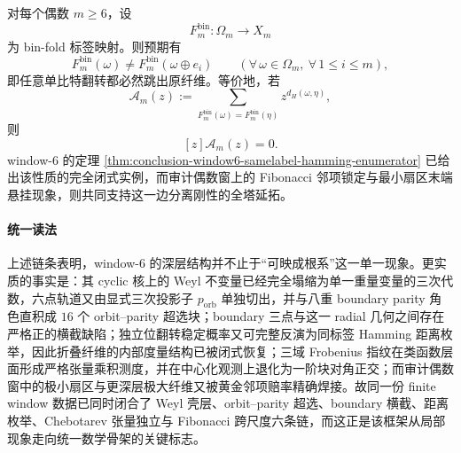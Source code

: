 

\begin{conjecture}[偶数窗的全塔边分离刚性]\label{conj:conclusion-even-window-global-edge-separation}
对每个偶数 \(m\ge 6\)，设
\[
F_m^{\mathrm{bin}}:\Omega_m\to X_m
\]
为 bin-fold 标签映射。则预期有
\[
F_m^{\mathrm{bin}}(\omega)\neq F_m^{\mathrm{bin}}(\omega\oplus e_i)
\qquad
(\forall\,\omega\in \Omega_m,\ \forall\,1\le i\le m),
\]
即任意单比特翻转都必然跳出原纤维。等价地，若
\[
\mathcal A_m(z):=
\sum_{F_m^{\mathrm{bin}}(\omega)=F_m^{\mathrm{bin}}(\eta)}z^{d_H(\omega,\eta)},
\]
则
\[
[z]\mathcal A_m(z)=0.
\]
window-\(6\) 的定理 \ref{thm:conclusion-window6-samelabel-hamming-enumerator} 已给出该性质的完全闭式实例，而审计偶数窗上的 Fibonacci 邻项锁定与最小扇区末端悬挂现象，则共同支持这一边分离刚性的全塔延拓。
\end{conjecture}

\paragraph{统一读法}
上述链条表明，window-\(6\) 的深层结构并不止于“可映成根系”这一单一现象。更实质的事实是：其 cyclic 核上的 Weyl 不变量已经完全塌缩为单一重量变量的三次代数，六点轨道又由显式三次投影子 \(p_{\mathrm{orb}}\) 单独切出，并与八重 boundary parity 角色直积成 \(16\) 个 orbit--parity 超选块；boundary 三点与这一 radial 几何之间存在严格正的横截缺陷；独立位翻转稳定概率又可完整反演为同标签 Hamming 距离枚举，因此折叠纤维的内部度量结构已被闭式恢复；三域 Frobenius 指纹在类函数层面形成严格张量乘积测度，并在中心化观测上退化为一阶块对角正交；而审计偶数窗中的极小扇区与更深层极大纤维又被黄金邻项赔率精确焊接。故同一份 finite window 数据已同时闭合了 Weyl 壳层、orbit--parity 超选、boundary 横截、距离枚举、Chebotarev 张量独立与 Fibonacci 跨尺度六条链，而这正是该框架从局部现象走向统一数学骨架的关键标志。

\endinput
